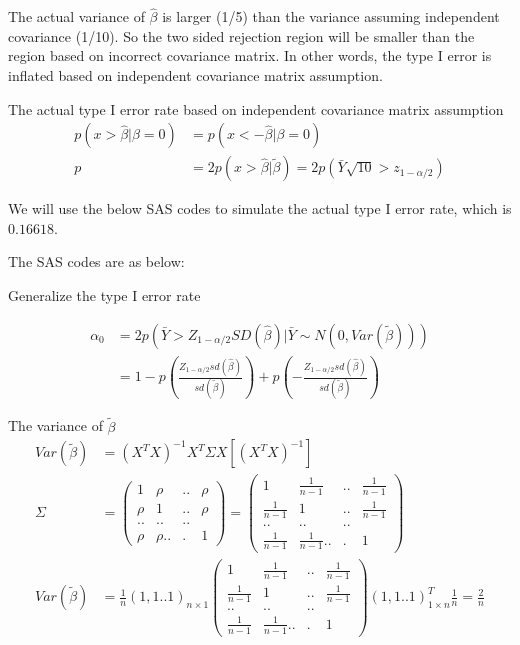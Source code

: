 \begin{itemize}
The actual variance of $\hat{\beta}$ is larger (1/5) than the variance assuming independent covariance (1/10). So the two sided rejection region will be smaller than the region based on incorrect covariance matrix. In other words, the type I error is inflated based on independent covariance matrix assumption.

The actual type I error rate based on independent covariance matrix assumption
\begin{align*}
	p(x > \hat{\beta} | \beta = 0) &= p(x <- \hat{\beta} |  \beta = 0) \\
	p &= 2 p(x> \hat{\beta} | \tilde{\beta}) = 2 p(\bar{Y} \sqrt{10} > z_{1-\alpha/2})
\end{align*}

We will use the below SAS codes to simulate the actual type I error rate, which is $ 0.16618$. 

The SAS codes are as below:


Generalize the type I error rate 

\begin{align*}
	\alpha_0 &= 2p( \bar{Y} > Z_{1-\alpha/2} SD(\hat{\beta}) | \bar{Y} \sim N(0, Var(\tilde{\beta}))) \\
	&= 1 - p(\frac{Z_{1-\alpha/2} sd(\hat{\beta})}{sd(\tilde{\beta})}) + p(- \frac{Z_{1-\alpha/2} sd(\hat{\beta})}{sd(\tilde{\beta})})
\end{align*}

The variance of $\tilde{\beta}$
\begin{align*}
	Var(\tilde{\beta} ) &= (X^T X)^{-1}X^T \Sigma X [(X^T X)^{-1}]  \\
	\Sigma &= \begin{pmatrix}
		1 & \rho &.. & \rho \\
		\rho & 1 &.. & \rho\\
		.. &.. & ..& \\
		\rho & \rho ..&. & 1 
	\end{pmatrix} = \begin{pmatrix}
		1 & \frac{1}{n-1} &.. & \frac{1}{n-1} \\
		\frac{1}{n-1}  & 1 &.. & \frac{1}{n-1} \\
		.. &.. & ..& \\
		\frac{1}{n-1}  & \frac{1}{n-1}  ..&. & 1 
	\end{pmatrix} \\
	Var(\tilde{\beta} ) &= \frac{1}{n} (1,1..1)_{n \times 1} \begin{pmatrix}
		1 & \frac{1}{n-1} &.. & \frac{1}{n-1} \\
		\frac{1}{n-1}  & 1 &.. & \frac{1}{n-1} \\
		.. &.. & ..& \\
		\frac{1}{n-1}  & \frac{1}{n-1}  ..&. & 1 
	\end{pmatrix}  (1,1..1)^T_{1 \times n} \frac{1}{n}  = \frac{2}{n}
\end{align*}


\end{itemize}
